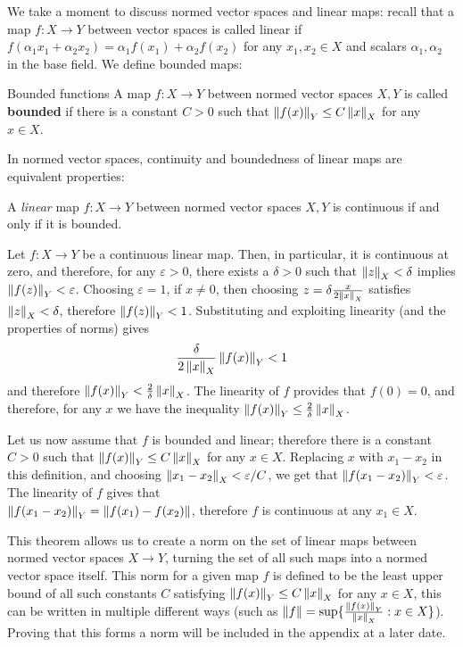 We take a moment to discuss normed vector spaces and linear maps: recall that a map $f : X \to Y$ between vector spaces is called linear if \mbox{$f(\alpha_{1} x_{1} + \alpha_{2} x_{2}) = \alpha_{1} f(x_{1}) + \alpha_{2} f(x_{2})$} for any $x_{1},x_{2} \in X$ and scalars $\alpha_{1},\alpha_{2}$ in the base field. We define bounded maps:
\begin{bdefin}{Bounded functions}{}
A map $f : X \to Y$ between normed vector spaces $X,Y$ is called \textbf{bounded} if there is a constant $C>0$ such that \mbox{$\left\lVert f(x) \right\rVert_{Y} \leq C\left\lVert x \right\rVert_{X}$} for any $x\in X$. 
\end{bdefin}
In normed vector spaces, continuity and boundedness of linear maps are equivalent properties:
\begin{btheorem}{}{}
A \emph{linear} map $f : X \to Y$ between normed vector spaces $X,Y$ is continuous if and only if it is bounded.
\end{btheorem}
\begin{bproof}{}{}
Let $f : X \to Y$ be a continuous linear map. Then, in particular, it is continuous at zero, and therefore, for any $\varepsilon>0$, there exists a $\delta>0$ such that \mbox{$\left\lVert z \right\rVert_{X} < \delta$} implies \mbox{$\left\lVert f(z) \right\rVert_{Y} < \varepsilon $}. Choosing $\varepsilon = 1$, if $x\neq 0$, then choosing \mbox{$z = \delta \frac{x}{2 \left\lVert x \right\rVert_{X}}$} satisfies \mbox{$\left\lVert z \right\rVert_{X} < \delta$}, therefore \mbox{$\left\lVert f(z) \right\rVert_{Y}<1$}. Substituting and exploiting linearity (and the properties of norms) gives \[ \frac{\delta}{2\left\lVert x \right\rVert_{X}} \left\lVert f(x) \right\rVert_{Y} < 1 \] and therefore \mbox{$\left\lVert f(x) \right\rVert_{Y} < \frac{2}{\delta} \left\lVert x \right\rVert_{X}$}. The linearity of $f$ provides that $f(0)=0$, and therefore, for any $x$ we have the inequality \mbox{$\left\lVert f(x) \right\rVert_{Y} \leq \frac{2}{\delta} \left\lVert x \right\rVert_{X}$}.

Let us now assume that $f$ is bounded and linear; therefore there is a constant $C>0$ such that \mbox{$\left\lVert f(x) \right\rVert_{Y} \leq C\left\lVert x \right\rVert_{X}$} for any $x\in X$. Replacing $x$ with $x_{1}-x_{2}$ in this definition, and choosing \mbox{$\left\lVert x_{1} - x_{2} \right\rVert_{X} < {\varepsilon}/{C}$}, we get that \mbox{$\left\lVert f(x_{1} - x_{2}) \right\rVert_{Y} < \varepsilon$}. The linearity of $f$ gives that \\  \mbox{$\left\lVert f(x_{1} - x_{2}) \right\rVert_{Y} = \left\lVert f(x_{1}) - f(x_{2}) \right\rVert$}, therefore $f$ is continuous at any $x_{1} \in X$.
\eop
\end{bproof}

This theorem allows us to create a norm on the set of linear maps between normed vector spaces $X \to Y$, turning the set of all such maps into a normed vector space itself. This norm for a given map $f$ is defined to be the least upper bound of all such constants $C$ satisfying \mbox{$\left\lVert f(x) \right\rVert_{Y} \leq C\left\lVert x \right\rVert_{X}$} for any $x\in X$, this can be written in multiple different ways (such as \mbox{$\left\lVert f \right\rVert = \sup\{ \frac{\left\lVert f(x) \right\rVert_{Y}}{\left\lVert x \right\rVert_{X}} : x \in X \}$}). Proving that this forms a norm will be included in the appendix at a later date.

